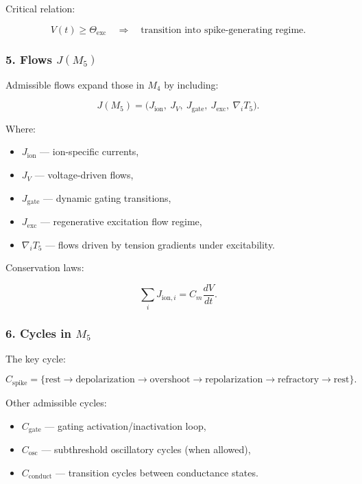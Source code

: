 Critical relation:

\[
V(t) \ge \Theta_{\mathrm{exc}} \quad\Rightarrow\quad
\text{transition into spike-generating regime}.
\]

\subsubsection*{5. Flows \texorpdfstring{$J(M_5)$}{J(M_5)}}

Admissible flows expand those in $M_4$ by including:

\[
J(M_5) =
\big(
J_{\mathrm{ion}},\
J_V,\
J_{\mathrm{gate}},\
J_{\mathrm{exc}},\
\nabla_i T_5
\big).
\]

Where:

\begin{itemize}
    \item $J_{\mathrm{ion}}$ — ion-specific currents,
    \item $J_V$ — voltage-driven flows,
    \item $J_{\mathrm{gate}}$ — dynamic gating transitions,
    \item $J_{\mathrm{exc}}$ — regenerative excitation flow regime,
    \item $\nabla_i T_5$ — flows driven by tension gradients under excitability.
\end{itemize}

Conservation laws:

\[
\sum_i J_{\mathrm{ion},i} = C_m \frac{dV}{dt}.
\]

\subsubsection*{6. Cycles in \texorpdfstring{$M_5$}{M_5}}

The key cycle:

\[
C_{\mathrm{spike}}
=
\{\text{rest} \to \text{depolarization} \to
\text{overshoot} \to \text{repolarization} \to \text{refractory} \to \text{rest}\}.
\]

Other admissible cycles:

\begin{itemize}
    \item $C_{\mathrm{gate}}$ — gating activation/inactivation loop,
    \item $C_{\mathrm{osc}}$ — subthreshold oscillatory cycles (when allowed),
    \item $C_{\mathrm{conduct}}$ — transition cycles between conductance states.
\end{itemize}

